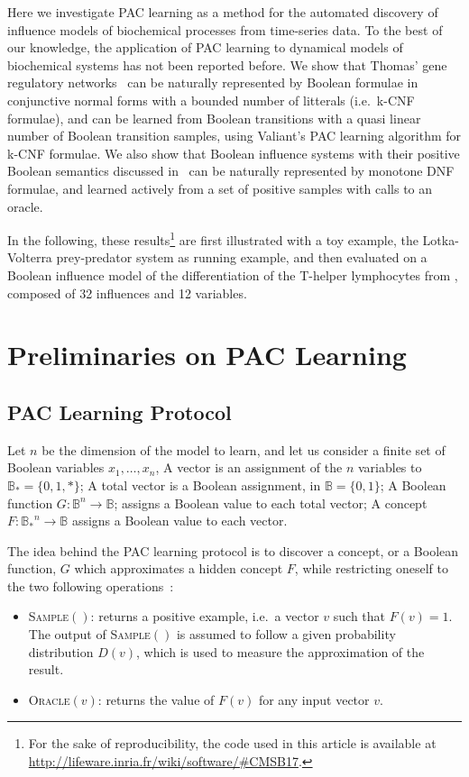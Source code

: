\documentclass{llncs}
\begin{document}
Here we investigate PAC learning as a method for the automated discovery of influence models of biochemical processes from time-series data. 
To the best of our knowledge, 
the application of PAC learning to dynamical models of biochemical systems has not been reported before.
We show that Thomas' gene regulatory networks~\cite{Thomas91jtb,Thomas73jtb} can be naturally represented by 
Boolean formulae in conjunctive normal forms with a bounded number of litterals (i.e.~k-CNF formulae),
and can be learned from Boolean transitions with a quasi linear number of Boolean transition samples, using Valiant's PAC learning algorithm for k-CNF formulae.
We also show that Boolean influence systems with their positive Boolean semantics discussed in~\cite{FMRS16cmsb}
can be naturally represented by monotone DNF formulae,
and learned actively from a set of positive samples with calls to an oracle.

In the following, these results\footnote{For the sake of reproducibility, the code used in this article is available at \url{http://lifeware.inria.fr/wiki/software/\#CMSB17}.} are first illustrated with a toy example, the Lotka-Volterra prey-predator system as running example,
and then evaluated on a Boolean influence model of 
the differentiation of the T-helper lymphocytes from \cite{RRMTC06tcsb,Mendoza06biosystems},
composed of 32 influences and 12 variables.


\section{Preliminaries on PAC Learning}\label{pac}

\subsection{PAC Learning Protocol}

Let $n$ be the dimension of the model to learn, and let us consider a finite set of Boolean variables $x_1,\ldots,x_n$,
 A vector is an assignment of the $n$ variables to $\mathbb{B}_* = \{0,1,*\}$;
 A total vector is a Boolean assignment, in $\mathbb{B} = \{0,1\}$;
 A Boolean function $G:{\mathbb{B}}^n \rightarrow \mathbb{B}$;
	assigns a Boolean value to each total vector;
 A concept $F:{\mathbb{B}_*}^n \rightarrow \mathbb{B}$
	assigns a Boolean value to each vector.

The idea behind the PAC learning protocol is to discover a concept, or a Boolean function, $G$ which approximates a hidden concept $F$, while restricting oneself to the two following operations~:
\begin{itemize}
  \item
\textsc{Sample}$()$: returns a positive example, i.e.~a vector $v$ such that $F(v)=1$.
The output of \textsc{Sample}$()$ is assumed to follow a given probability distribution $D(v)$, which is used to measure the approximation of the result.
  \item
\textsc{Oracle}$(v)$: returns the value of $F(v)$ for any input vector $v$.
\end{itemize}
\end{document}
